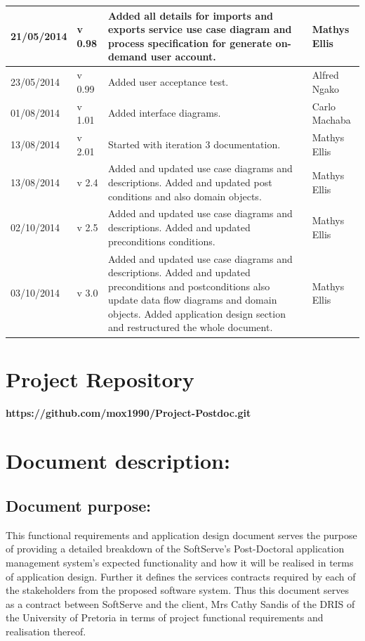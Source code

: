 \documentclass[12pt]{article}
\newcommand{\repo}{https://github.com/mox1990/Project-Postdoc.git}
\begin{document}
\begin{center}
\begin{longtable}{|l|p{1.4cm}|p{8cm}|p{2.8cm}|}
\hline
21/05/2014 & v 0.98 & Added all details for imports and exports service use case diagram and process specification for generate on-demand user account. & Mathys Ellis \\
\hline
23/05/2014 & v 0.99 & Added user acceptance test. & Alfred Ngako \\
\hline
01/08/2014 & v 1.01 & Added interface diagrams. & Carlo Machaba \\
\hline
13/08/2014 & v 2.01 & Started with iteration 3 documentation. & Mathys Ellis \\
\hline
13/08/2014 & v 2.4 & Added and updated use case diagrams and descriptions. Added and updated post conditions and also domain objects. & Mathys Ellis \\
\hline
02/10/2014 & v 2.5 & Added and updated use case diagrams and descriptions. Added and updated preconditions conditions. & Mathys Ellis \\
\hline
03/10/2014 & v 3.0 & Added and updated use case diagrams and descriptions. Added and updated preconditions and postconditions also update data flow diagrams and domain objects. Added application design section and restructured the whole document. & Mathys Ellis \\
\hline

\end{longtable}
\end{center}
\newpage
\tableofcontents

\listoffigures
\newpage
\section{Project Repository}
\textbf{\repo}
\newpage
\section{Document description:}

\subsection{Document purpose:}
\vspace{0.2in}
This functional requirements and application design document serves the purpose of providing a detailed breakdown of the SoftServe's Post-Doctoral application management system's expected functionality and how it will be realised in terms of application design. Further it defines the services contracts required by each of the stakeholders from the proposed software system. Thus this document serves as a contract between SoftServe and the client, Mrs Cathy Sandis of the DRIS of the University of Pretoria in terms of project functional requirements and realisation thereof.
\end{document}
